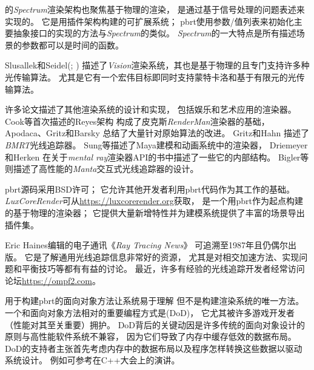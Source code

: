 \citet{glassner1993spectrum}的\emph{Spectrum}渲染架构也聚焦基于物理的渲染，
是通过基于信号处理的问题表述来实现的。
它是用插件架构构建的可扩展系统；
pbrt使用参数/值列表来初始化主要抽象接口的实现的方法与\emph{Spectrum}的类似。
\emph{Spectrum}的一大特点是所有描述场景的参数都可以是时间的函数。

Slusallek和Seidel(\cite*{468387,10.1007/978-3-7091-7484-5_6}; \citealt{slusallek1996vision})
描述了\emph{Vision}渲染系统，其也是基于物理的且专门支持许多种光传输算法。
尤其是它有一个宏伟目标即同时支持蒙特卡洛和基于有限元的光传输算法。

许多论文描述了其他渲染系统的设计和实现，
包括娱乐和艺术应用的渲染器。
Cook等\parencite*{10.1145/37401.37414}首次描述的Reyes架构
构成了皮克斯\emph{RenderMan}渲染器的基础，
Apodaca、Gritz和Barsky \parencite*{10.5555/555371}
总结了大量针对原始算法的改进。
Gritz和Hahn \parencite*{doi:10.1080/10867651.1996.10487462}描述了\emph{BMRT}光线追踪器。
Sung等\parencite*{732097}描述了Maya建模和动画系统中的渲染器，
Driemeyer和Herken \parencite*{10.5555/863712}
在关于\emph{mental ray}渲染器API的书中描述了一些它的内部结构。
Bigler等\parencite*{4061561}则描述了高性能的\emph{Manta}交互式光线追踪器的设计。

pbrt源码采用BSD许可；
它允许其他开发者利用pbrt代码作为其工作的基础。
\emph{LuxCoreRender}可从\url{https://luxcorerender.org}获取，
是一个用pbrt作为起点构建的基于物理的渲染器；
它提供大量新增特性并为建模系统提供了丰富的场景导出插件集。

Eric Haines编辑的电子通讯《\emph{Ray Tracing News}》
可追溯至1987年且仍偶尔出版。
它是了解通用光线追踪信息非常好的资源，
尤其是对相交加速方法、实现问题和平衡技巧等都有有益的讨论。
最近，许多有经验的光线追踪开发者经常访问论坛\url{https://ompf2.com}。

用于构建pbrt的面向对象方法让系统易于理解
但不是构建渲染系统的唯一方法。
一个和面向对象方法相对的重要编程方式是(DoD)，
它尤其被许多游戏开发者（性能对其至关重要）拥护。
DoD背后的关键动因是许多传统的面向对象设计的原则与高性能软件系统不兼容，
因为它们导致了内存中缓存低效的数据布局。
DoD的支持者主张首先考虑内存中的数据布局以及程序怎样转换这些数据以驱动系统设计。
例如可参考\citet{acton_2014}在C++大会上的演讲。